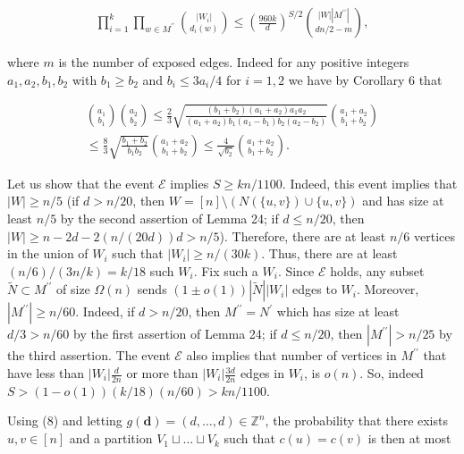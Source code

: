 \documentclass[10pt,a4paper]{article}
\begin{document}
\[\begin{gathered}
\prod_{i=1}^{k}\prod_{w\in M^{\prime\prime}}\binom{|W_{i}|}{d_{i}(w)}\leq\left(\frac{960k}{d}\right)^{S/2}\binom{|W||M^{\prime\prime}|}{dn/2-m},
\end{gathered}\]


where $m$ is the number of exposed edges.
Indeed for any positive integers $a_{1},a_{2},b_{1},b_{2}$ with $b_{1}\geq b_{2}$ and $b_{i}\leq 3a_{i}/4$ for $i=1,2$ we have by Corollary 6 that\par


\[\begin{gathered}
\displaystyle\binom{a_{1}}{b_{1}}\binom{a_{2}}{b_{2}} \displaystyle\leq\frac{2}{3}\sqrt{\frac{(b_{1}+b_{2})(a_{1}+a_{2})a_{1}a_{2}}{(a_{1}+a_{2})b_{1}(a_{1}-b_{1})b_{2}(a_{2}-b_{2})}}\binom{a_{1}+a_{2}}{b_{1}+b_{2}} \\
\displaystyle\leq\frac{8}{3}\sqrt{\frac{b_{1}+b_{2}}{b_{1}b_{2}}}\binom{a_{1}+a_{2}}{b_{1}+b_{2}}\leq{\frac{4}{\sqrt{b_{2}}}}\binom{a_{1}+a_{2}}{b_{1}+b_{2}}.
\end{gathered}\]




Let us show that the event $\mathcal{E}$ implies $S\geq kn/1100$. Indeed, this event implies that $|W|\geq n/5$ (if $d>n/20$, then $W=[n]\setminus(N(\{u,v\})\cup\{u,v\})$ and has size at least $n/5$ by the second assertion of Lemma 24; if $d\leq n/20$, then $|W|\geq n-2d-2(n/(20d))d>n/5$). Therefore, there are at least $n/6$ vertices in the union of $W_{i}$ such that $|W_{i}|\geq n/(30k)$. Thus, there are at least $(n/6)/(3n/k)=k/18$ such $W_{i}$. Fix such a $W_{i}$. Since $\mathcal{E}$ holds, any subset $\tilde{N}\subset M^{\prime\prime}$ of size $\Omega(n)$ sends $(1\pm o(1))|\tilde{N}||W_{i}|$ edges to $W_{i}$. Moreover, $|M^{\prime\prime}|\geq n/60$. Indeed, if $d>n/20$, then $M^{\prime\prime}=N^{\prime}$ which has size at least $d/3>n/60$ by the first assertion of Lemma 24; if $d\leq n/20$, then $|M^{\prime\prime}|>n/25$ by the third assertion. The event $\mathcal{E}$ also implies that number of vertices in $M^{\prime\prime}$ that have less than $|W_{i}|\frac{d}{2n}$ or more than $|W_{i}|\frac{3d}{2n}$ edges in $W_{i}$, is $o(n)$. So, indeed $S>(1-o(1))(k/18)(n/60)>kn/1100$.\par




Using (8) and letting $g(\mathbf{d})=(d,\ldots,d)\in\mathbb{Z}^{n}$, the probability that there exists $u,v\in[n]$ and a partition $V_{1}\sqcup\ldots\sqcup V_{k}$ such that $c(u)=c(v)$ is then at most\par
\end{document}
